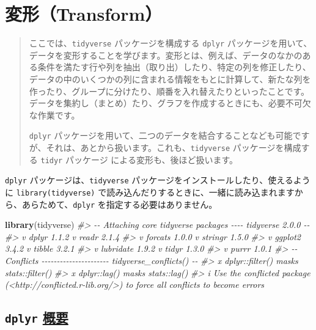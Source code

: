 \documentclass[
  xelatex, ja=standard]{bxjsbook}
\newenvironment{Shaded}{\begin{snugshade}}{\end{snugshade}}
\newcommand{\CommentTok}[1]{\textcolor[rgb]{0.56,0.35,0.01}{\textit{#1}}}
\newcommand{\FunctionTok}[1]{\textcolor[rgb]{0.13,0.29,0.53}{\textbf{#1}}}
\newcommand{\NormalTok}[1]{#1}
\theoremstyle{definition}
\theoremstyle{definition}
\theoremstyle{definition}
\theoremstyle{definition}
\theoremstyle{remark}
\begin{document}
\hypertarget{transform}{%
\chapter{変形（Transform）}\label{transform}}

\begin{quote}
ここでは、\texttt{tidyverse} パッケージを構成する \texttt{dplyr} パッケージを用いて、データを変形することを学びます。変形とは、例えば、データのなかのある条件を満たす行や列を抽出（取り出）したり、特定の列を修正したり、データの中のいくつかの列に含まれる情報をもとに計算して、新たな列を作ったり、グループに分けたり、順番を入れ替えたりといったことです。データを集約し（まとめ）たり、グラフを作成するときにも、必要不可欠な作業です。

\texttt{dplyr} パッケージを用いて、二つのデータを結合することなども可能ですが、それは、あとから扱います。これも、\texttt{tidyverse} パッケージを構成する \texttt{tidyr} パッケージ による変形も、後ほど扱います。
\end{quote}

\texttt{dplyr} パッケージは、\texttt{tidyverse} パッケージをインストールしたり、使えるように \texttt{library(tidyverse)} で読み込んだりするときに、一緒に読み込まれますから、あらためて、\texttt{dplyr} を指定する必要はありません。

\begin{Shaded}
\begin{Highlighting}[]
\FunctionTok{library}\NormalTok{(tidyverse)}
\CommentTok{\#\textgreater{} {-}{-} Attaching core tidyverse packages {-}{-}{-}{-} tidyverse 2.0.0 {-}{-}}
\CommentTok{\#\textgreater{} v dplyr     1.1.2     v readr     2.1.4}
\CommentTok{\#\textgreater{} v forcats   1.0.0     v stringr   1.5.0}
\CommentTok{\#\textgreater{} v ggplot2   3.4.2     v tibble    3.2.1}
\CommentTok{\#\textgreater{} v lubridate 1.9.2     v tidyr     1.3.0}
\CommentTok{\#\textgreater{} v purrr     1.0.1     }
\CommentTok{\#\textgreater{} {-}{-} Conflicts {-}{-}{-}{-}{-}{-}{-}{-}{-}{-}{-}{-}{-}{-}{-}{-}{-}{-}{-}{-}{-}{-} tidyverse\_conflicts() {-}{-}}
\CommentTok{\#\textgreater{} x dplyr::filter() masks stats::filter()}
\CommentTok{\#\textgreater{} x dplyr::lag()    masks stats::lag()}
\CommentTok{\#\textgreater{} i Use the conflicted package (\textless{}http://conflicted.r{-}lib.org/\textgreater{}) to force all conflicts to become errors}
\end{Highlighting}
\end{Shaded}

\hypertarget{dplyr-ux6982ux8981}{%
\section{\texorpdfstring{\texttt{dplyr} \href{https://dplyr.tidyverse.org}{概要}}{dplyr 概要}}\label{dplyr-ux6982ux8981}}
\end{document}
